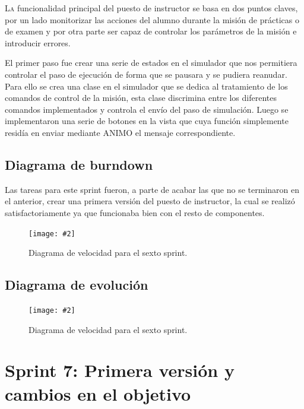 \documentclass[12pt,a4paper,spanish]{book} %
\newcommand{\imgCentradaGrande}[3]{
\begin{figure}[H]
\begin{center}
\texttt{[image: \#2]}
\caption{#3}
\label{#1}
\end{center}
\end{figure}
}
\begin{document}
\lettrine{L}{a} funcionalidad principal del puesto de instructor se basa en dos puntos claves, por un lado monitorizar las acciones del alumno durante la misión de prácticas o de examen y por otra parte ser capaz de controlar los parámetros de la misión e introducir errores.

El primer paso fue crear una serie de estados en el simulador que nos permitiera controlar el paso de ejecución de forma que se pausara y se pudiera reanudar. Para ello se crea una clase en el simulador que se dedica al tratamiento de los comandos de control de la misión, esta clase discrimina entre los diferentes comandos implementados y controla el envío del paso de simulación. Luego se implementaron una serie de botones en la vista que cuya función simplemente residía en enviar mediante ANIMO el mensaje correspondiente.

\subsection{Diagrama de burndown}

Las tareas para este sprint fueron, a parte de acabar las que no se terminaron en el anterior, crear una primera versión del puesto de instructor, la cual se realizó satisfactoriamente ya que funcionaba bien con el resto de componentes.

\imgCentradaGrande{fig.4.19}{img/diagvelocidad6.eps}{Diagrama de velocidad para el sexto sprint.}

\subsection{Diagrama de evolución}

\imgCentradaGrande{fig.4.20}{img/diagevolucion6.eps}{Diagrama de velocidad para el sexto sprint.}

\newpage
\section{Sprint 7: Primera versión y cambios en el objetivo}
\end{document}
